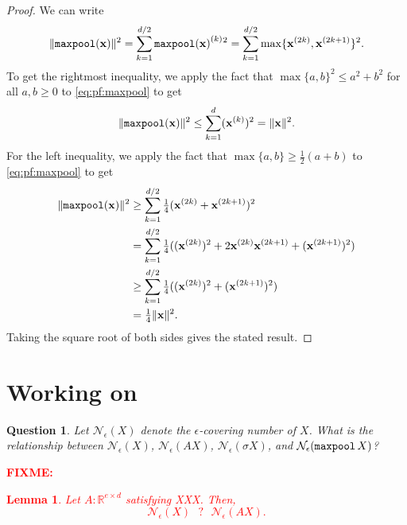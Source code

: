 \documentclass{article}
\newtheorem{lemma}{Lemma}
\newtheorem{question}{Question}
\newcommand{\R}{\mathbb{R}}
\newcommand{\ltwo}[1]{\lVert {#1} \rVert}
\newcommand{\x}{\mathbf x}
\newcommand{\fixme}[1]{\textcolor{red}{\textbf{FIXME:} {#1}}}
\DeclareMathOperator{\maxpool}{\textup{\texttt{maxpool}}}
\newcommand{\covnum}[2]{\mathcal N_{#1}(#2)}
\newcommand{\elem}[2]{{#2}^{(#1)}}
\begin{document}
\begin{proof}
    We can write
    \begin{equation}
        \ltwo{\maxpool(\x)}^2
        =
        \sum_{k=1}^{d/2} {\elem k {\maxpool(\x)}}{}^2
        =
        \sum_{k=1}^{d/2} \max\{\elem{2k}\x,\elem{2k+1}\x\}^2
        \label{eq:pf:maxpool}
        .
    \end{equation}
    To get the rightmost inequality, we apply the fact that $\max\{a,b\}^2 \le a^2 + b^2$ for all $a,b\ge0$ to \eqref{eq:pf:maxpool} to get
    \begin{align}
        \ltwo{\maxpool(\x)}^2
        \le
        \sum_{k=1}^{d} (\elem{k}\x)^2
        =
        \ltwo{\x}^2
        .
    \end{align}
    For the left inequality,
    we apply the fact that $\max\{a,b\} \ge \tfrac12(a+b)$ to \eqref{eq:pf:maxpool} to get
    \begin{align}
        \ltwo{\maxpool(\x)}^2
        &\ge
        \sum_{k=1}^{d/2} \tfrac14(\elem{2k}\x+\elem{2k+1}\x)^2
        \\&=
        \sum_{k=1}^{d/2} \tfrac14((\elem{2k}\x)^2+2\elem{2k}\x\elem{2k+1}\x+(\elem{2k+1}\x)^2)
        \\&\ge
        \sum_{k=1}^{d/2} \tfrac14((\elem{2k}\x)^2+(\elem{2k+1}\x)^2)
        \\&=
        \tfrac14\ltwo{\x}^2
        .
    \end{align}
    Taking the square root of both sides gives the stated result.
\end{proof}


\section{Working on}

\begin{question}
    Let $\covnum\epsilon X$ denote the $\epsilon$-covering number of $X$.
    What is the relationship between $\covnum\epsilon X$, $\covnum\epsilon {AX}$, $\covnum\epsilon {\sigma X}$, and $\covnum\epsilon{\maxpool X}$?
\end{question}

\fixme{
\begin{lemma}
    Let $A : \R^{e\times d}$ satisfying XXX. 
    Then,
    \begin{equation}
        \covnum\epsilon X 
        ~~~?~~~ 
        \covnum\epsilon{AX}
        .
    \end{equation}
\end{lemma}
}
\end{document}
